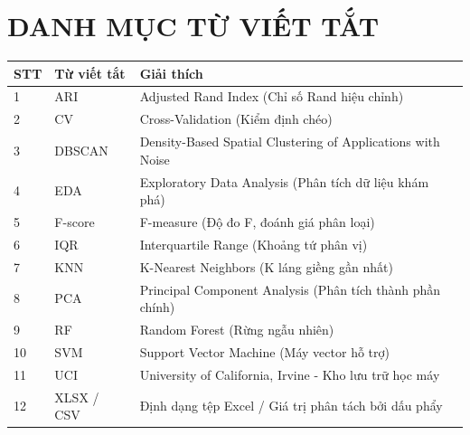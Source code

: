 \chapter*{DANH MỤC TỪ VIẾT TẮT}

\begin{table}[H]
\centering
\begin{tabular}{|l|l|>{\raggedright\arraybackslash}p{8.2cm}|}
\hline
\textbf{STT} & \textbf{Từ viết tắt} & \textbf{Giải thích} \\ \hline
1 & ARI & Adjusted Rand Index (Chỉ số Rand hiệu chỉnh) \\ \hline
2 & CV & Cross-Validation (Kiểm định chéo) \\ \hline
3 & DBSCAN & Density-Based Spatial Clustering of Applications with Noise \\ \hline
4 & EDA & Exploratory Data Analysis (Phân tích dữ liệu khám phá) \\ \hline
5 & F-score & F-measure (Độ đo F, đoánh giá phân loại) \\ \hline
6 & IQR & Interquartile Range (Khoảng tứ phân vị) \\ \hline
7 & KNN & K-Nearest Neighbors (K láng giềng gần nhất) \\ \hline
8 & PCA & Principal Component Analysis (Phân tích thành phần chính) \\ \hline
9 & RF & Random Forest (Rừng ngẫu nhiên) \\ \hline
10 & SVM & Support Vector Machine (Máy vector hỗ trợ) \\ \hline
11 & UCI & University of California, Irvine - Kho lưu trữ học máy \\ \hline
12 & XLSX / CSV & Định dạng tệp Excel / Giá trị phân tách bởi dấu phẩy \\ \hline
\end{tabular}
\end{table}
